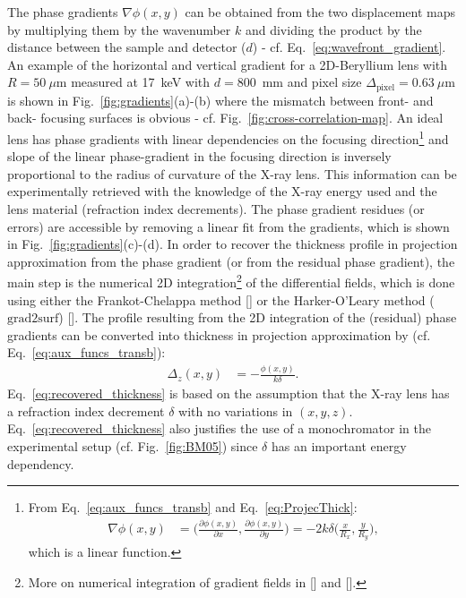\begin{refsection}
The phase gradients $\nabla\phi(x,y)$ can be obtained from the two displacement maps by multiplying them by the wavenumber $k$ and dividing the product by the distance between the sample and detector ($d$) - cf. Eq.~\ref{eq:wavefront_gradient}. An example of the horizontal and vertical gradient for a 2D-Beryllium lens with $R=50~\mu$m measured at 17~keV with $d=800$~mm and pixel size $\Delta_\text{pixel}= 0.63~\mu$m is shown in Fig.~\ref{fig:gradients}(a)-(b) where the mismatch between front- and back- focusing surfaces is obvious - cf. Fig.~\ref{fig:cross-correlation-map}. An ideal lens has phase gradients with linear dependencies on the focusing direction\footnote{From Eq.~\ref{eq:aux_funcs_transb} and Eq.~\ref{eq:ProjecThick}: 
\begin{align*}
    \nabla\phi(x,y) & = \Bigg(\frac{\partial \phi(x,y)}{\partial x},\frac{\partial \phi(x,y)}{\partial y}  \Bigg) = -2k\delta\Bigg(\frac{x}{R_x},\frac{y}{R_y}\Bigg),
\end{align*}{}
which is a linear function.} and slope of the linear phase-gradient in the focusing direction is inversely proportional to the radius of curvature of the X-ray lens. This information  can be experimentally retrieved with the knowledge of the X-ray energy used and the lens material (refraction index decrements). The phase gradient residues (or errors) are accessible by removing a linear fit from the gradients, which is shown in Fig.~\ref{fig:gradients}(c)-(d). In order to recover the thickness profile in projection approximation from the phase gradient (or from the residual phase gradient), the main step is the numerical 2D integration\footnote{More on numerical integration of gradient fields in [\cite{Huang2015}] and [\cite{Agrawal2006}].} of the differential fields, which is done using either the Frankot-Chelappa method [\cite{Frankot1988}] or the Harker-O'Leary method ($\text{grad2surf}$) [\cite{Harker2015}]. The profile resulting from the 2D integration of the (residual) phase gradients can be converted into thickness in projection approximation by (cf. Eq.~\ref{eq:aux_funcs_transb}):
\begin{align}\label{eq:recovered_thickness}
     \Delta_z(x,y)&=-\frac{\phi(x,y)}{k\delta}.
\end{align}{}
Eq.~\ref{eq:recovered_thickness} is based on the assumption that the X-ray lens has a refraction index decrement $\delta$ with no variations in $(x,y,z)$. Eq.~\ref{eq:recovered_thickness} also justifies the use of a monochromator in the experimental setup (cf. Fig.~\ref{fig:BM05}) since $\delta$ has an important energy dependency.


\end{refsection}
